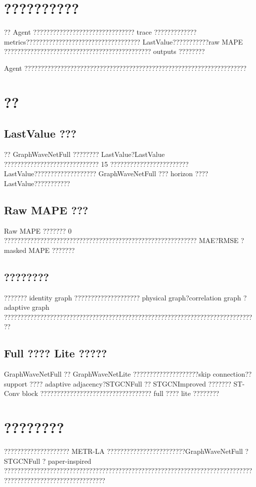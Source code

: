 \documentclass[11pt]{ctexart}
\begin{document}
\section{??????????}
?? Agent ??????????????????????????????? trace ????????????? metrics??????????????????????????????????? LastValue???????????raw MAPE ????????????????????????????????????????????? outputs ????????

Agent ????????????????????????????????????????????????????????????????????

\section{??}
\subsection{LastValue ???}
?? GraphWaveNetFull ???????? LastValue?LastValue ????????????????????????????? 15 ???????????????????????? LastValue??????????????????? GraphWaveNetFull ??? horizon ???? LastValue???????????

\subsection{Raw MAPE ???}
Raw MAPE ??????? 0 ??????????????????????????????????????????????????????????? MAE?RMSE ? masked MAPE ???????

\subsection{????????}
??????? identity graph ???????????????????? physical graph?correlation graph ? adaptive graph ??????????????????????????????????????????????????????????????????????????????

\subsection{Full ???? Lite ?????}
GraphWaveNetFull ?? GraphWaveNetLite ????????????????????skip connection?? support ???? adaptive adjacency?STGCNFull ?? STGCNImproved ??????? ST-Conv block ?????????????????????????????????? full ???? lite ????????

\section{????????}
???????????????????? METR-LA ????????????????????????GraphWaveNetFull ? STGCNFull ? paper-inspired ???????????????????????????????????????????????????????????????????????????????????????????????????????????
\end{document}
